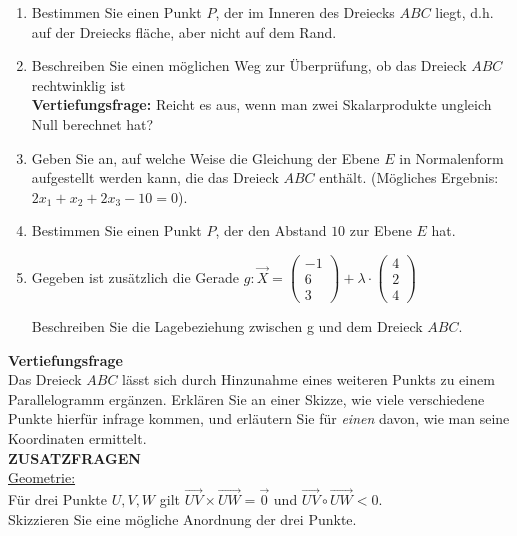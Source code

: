 \documentclass[a4paper,12pt]{article}
\begin{document}
\begin{enumerate}[label={\alph*)}]
  \item Bestimmen Sie einen Punkt $P$, der im Inneren des Dreiecks $ABC$ liegt, d.h. auf der Dreiecks fläche, aber nicht auf dem Rand.

 \item Beschreiben Sie einen möglichen Weg zur Überprüfung, ob das Dreieck $ABC$ rechtwinklig ist\\ 
   {\bf Vertiefungsfrage:} Reicht es aus, wenn man zwei Skalarprodukte ungleich Null berechnet hat?

  \item Geben Sie an, auf welche Weise die Gleichung der Ebene $E$ in Normalenform aufgestellt werden kann, die das Dreieck $ABC$ enthält. (Mögliches Ergebnis: $2x_1 + x_2 + 2x_3 -10 = 0$).

  \item Bestimmen Sie einen Punkt $P$, der den Abstand $10$ zur Ebene $E$ hat.

  \item Gegeben ist zusätzlich die Gerade $g: \vec{X}=\begin{pmatrix} -1 \\ 6 \\ 3 \end{pmatrix} + \lambda \cdot \begin{pmatrix} 4 \\ 2 \\ 4 \end{pmatrix}$

  Beschreiben Sie die Lagebeziehung zwischen g und dem Dreieck $ABC$.
\end{enumerate}


{\bf Vertiefungsfrage}\\
Das Dreieck $ABC$ lässt sich durch Hinzunahme eines weiteren Punkts zu einem Parallelogramm ergänzen. Erklären Sie an einer Skizze, wie viele verschiedene Punkte hierfür infrage kommen, und erläutern Sie für \textit{einen} davon, wie man seine Koordinaten ermittelt.\\

{\bf ZUSATZFRAGEN}\\

\underline{Geometrie:}\\

Für drei Punkte $U, V, W$ gilt $\overrightarrow{UV} \times \overrightarrow{UW} = \vec{0}$ und $ \overrightarrow{UV} \circ \overrightarrow{UW} < 0$.\\
Skizzieren Sie eine mögliche Anordnung der drei Punkte.\\
\end{document}
